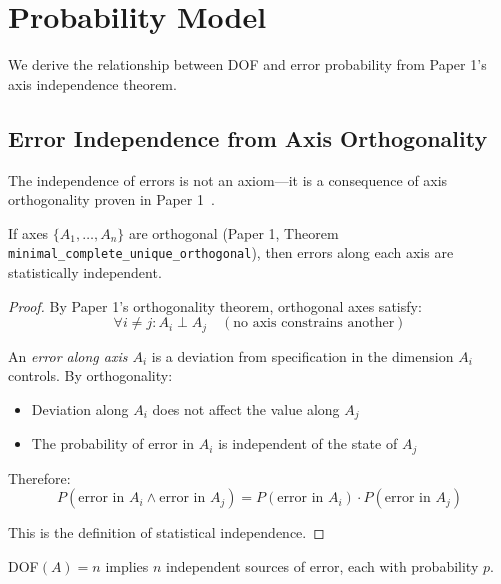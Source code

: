 \section{Probability Model}\label{probability-model}

We derive the relationship between DOF and error probability from Paper 1's axis independence theorem.

\subsection{Error Independence from Axis Orthogonality}

The independence of errors is not an axiom---it is a consequence of axis orthogonality proven in Paper 1~\cite{paper1_typing_discipline}.

\begin{theorem}\label{thm:error-independence}
If axes $\{A_1, \ldots, A_n\}$ are orthogonal (Paper 1, Theorem \texttt{minimal\_complete\_unique\_orthogonal}), then errors along each axis are statistically independent.
\end{theorem}

\begin{proof}
By Paper 1's orthogonality theorem, orthogonal axes satisfy:
\[
\forall i \neq j: A_i \perp A_j \quad (\text{no axis constrains another})
\]

An \emph{error along axis $A_i$} is a deviation from specification in the dimension $A_i$ controls. By orthogonality:
\begin{itemize}
\item Deviation along $A_i$ does not affect the value along $A_j$
\item The probability of error in $A_i$ is independent of the state of $A_j$
\end{itemize}

Therefore:
\[
P(\text{error in } A_i \land \text{error in } A_j) = P(\text{error in } A_i) \cdot P(\text{error in } A_j)
\]

This is the definition of statistical independence.
\end{proof}

\begin{corollary}[DOF = Independent Error Sources]\label{cor:dof-errors}
DOF$(A) = n$ implies $n$ independent sources of error, each with probability $p$.
\end{corollary}

